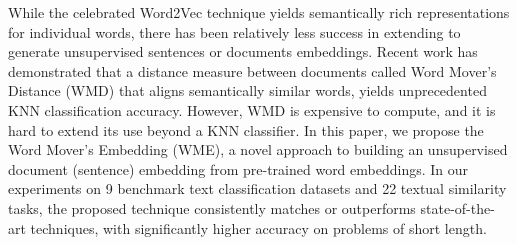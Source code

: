 While the celebrated Word2Vec technique yields semantically rich representations for individual words, there has been relatively less success in extending to generate unsupervised sentences or documents embeddings. Recent work has demonstrated that a distance measure between documents called Word Mover's Distance (WMD) that aligns semantically similar words, yields unprecedented KNN classification accuracy. However, WMD is expensive to compute, and it is hard to extend its use beyond a KNN classifier. In this paper, we propose the Word Mover's Embedding (WME), a novel approach to building an unsupervised document (sentence) embedding from pre-trained word embeddings. In our experiments on 9 benchmark text classification datasets and 22 textual similarity tasks, the proposed technique consistently matches or outperforms state-of-the-art techniques, with significantly higher accuracy on problems of short length.
